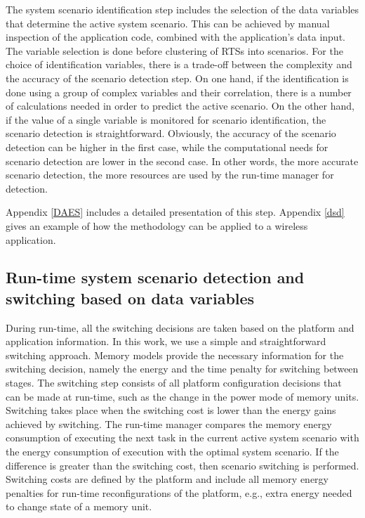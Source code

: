The system scenario identification step includes the selection of the data variables that determine the active system scenario. 
This can be achieved by manual inspection of the application code, combined with the application's data input.
The variable selection is done before clustering of RTSs into scenarios.
For the choice of identification variables, there is a trade-off between the complexity and the accuracy of the scenario detection step.
On one hand, if the identification is done using a group of complex variables and their correlation, there is a number of calculations needed in order to predict the active scenario. 
On the other hand, if the value of a single variable is monitored for scenario identification, the scenario detection is straightforward.
Obviously, the accuracy of the scenario detection can be higher in the first case, while the computational needs for scenario detection are lower in the second case.
In other words, the more accurate scenario detection, the more resources are used by the run-time manager for detection.

Appendix \ref{DAES} includes a detailed presentation of this step. Appendix \ref{dsd} gives an example of how the methodology can be applied to a wireless application.

\subsection{Run-time system scenario detection and switching based on data variables}

During run-time, all the switching decisions are taken based on the platform and application information. 
In this work, we use a simple and straightforward switching approach.
Memory models provide the necessary information for the switching decision, namely the energy and the time penalty for switching between stages.
The switching step consists of all platform configuration decisions that can be made at run-time, such as the change in the power mode of memory units.
Switching takes place when the switching cost is lower than the energy gains achieved by switching. 
The run-time manager compares the memory energy consumption of executing the next task in the current active system scenario with the energy consumption of execution with the optimal system scenario. 
If the difference is greater than the switching cost, then scenario switching is performed.
Switching costs are defined by the platform and include all memory energy penalties for run-time reconfigurations of the platform, e.g., extra energy needed to change state of a memory unit.


